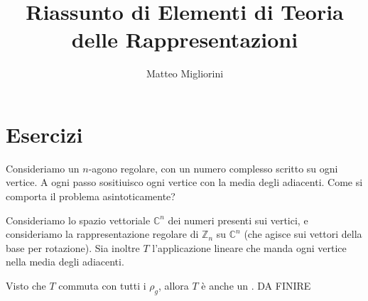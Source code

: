 \documentclass[a4paper,10pt,oneside]{math_article}
\title{Riassunto di Elementi di Teoria delle Rappresentazioni}
\author{Matteo Migliorini}
\date{}
\newcommand{\Cyc}{\mathbb Z}
\begin{document}
 
 
 \maketitle
 
 \cleardoublepage	
 
 \cleardoublepage
 \tableofcontents
 \cleardoublepage
 
 
 
 
 
 
 
 
 
 

  \section{Esercizi}
  \begin{myex}
   Consideriamo un $n$-agono regolare, con un numero complesso scritto su ogni vertice. A ogni passo sositiuisco ogni vertice con la media degli adiacenti. Come si comporta il problema asintoticamente?
   
   Consideriamo lo spazio vettoriale $\mathbb C^n$ dei numeri presenti sui vertici, e consideriamo la rappresentazione regolare di $\Cyc_n$ su $\mathbb C^n$ (che agisce sui vettori della base per rotazione). Sia inoltre $T$ l'applicazione lineare che manda ogni vertice nella media degli adiacenti.
   
   Visto che $T$ commuta con tutti i $\rho_g$, allora $T$ è anche un . DA FINIRE
  \end{myex}
\end{document}
